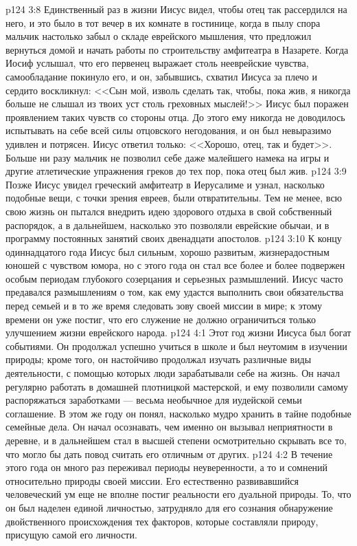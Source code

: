 \vs p124 3:8 Единственный раз в жизни Иисус видел, чтобы отец так рассердился на него, и это было в тот вечер в их комнате в гостинице, когда в пылу спора мальчик настолько забыл о складе еврейского мышления, что предложил вернуться домой и начать работы по строительству амфитеатра в Назарете. Когда Иосиф услышал, что его первенец выражает столь нееврейские чувства, самообладание покинуло его, и он, забывшись, схватил Иисуса за плечо и сердито воскликнул: <<Сын мой, изволь сделать так, чтобы, пока жив, я никогда больше не слышал из твоих уст столь греховных мыслей!>> Иисус был поражен проявлением таких чувств со стороны отца. До этого ему никогда не доводилось испытывать на себе всей силы отцовского негодования, и он был невыразимо удивлен и потрясен. Иисус ответил только: <<Хорошо, отец, так и будет>>. Больше ни разу мальчик не позволил себе даже малейшего намека на игры и другие атлетические упражнения греков до тех пор, пока отец был жив.
\vs p124 3:9 Позже Иисус увидел греческий амфитеатр в Иерусалиме и узнал, насколько подобные вещи, с точки зрения евреев, были отвратительны. Тем не менее, всю свою жизнь он пытался внедрить идею здорового отдыха в свой собственный распорядок, а в дальнейшем, насколько это позволяли еврейские обычаи, и в программу постоянных занятий своих двенадцати апостолов.
\vs p124 3:10 К концу одиннадцатого года Иисус был сильным, хорошо развитым, жизнерадостным юношей с чувством юмора, но с этого года он стал все более и более подвержен особым периодам глубокого созерцания и серьезных размышлений. Иисус часто предавался размышлениям о том, как ему удастся выполнить свои обязательства перед семьей и в то же время следовать зову своей миссии в мире; к этому времени он уже постиг, что его служение не должно ограничиться только улучшением жизни еврейского народа.
\vs p124 4:1 Этот год жизни Иисуса был богат событиями. Он продолжал успешно учиться в школе и был неутомим в изучении природы; кроме того, он настойчиво продолжал изучать различные виды деятельности, с помощью которых люди зарабатывали себе на жизнь. Он начал регулярно работать в домашней плотницкой мастерской, и ему позволили самому распоряжаться заработками --- весьма необычное для иудейской семьи соглашение. В этом же году он понял, насколько мудро хранить в тайне подобные семейные дела. Он начал осознавать, чем именно он вызывал неприятности в деревне, и в дальнейшем стал в высшей степени осмотрительно скрывать все то, что могло бы дать повод считать его отличным от других.
\vs p124 4:2 В течение этого года он много раз переживал периоды неуверенности, а то и сомнений относительно природы своей миссии. Его естественно развивавшийся человеческий ум еще не вполне постиг реальности его дуальной природы. То, что он был наделен единой личностью, затрудняло для его сознания обнаружение двойственного происхождения тех факторов, которые составляли природу, присущую самой его личности.
